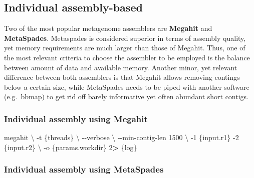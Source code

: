 \documentclass[
]{book}
\newenvironment{Shaded}{\begin{snugshade}}{\end{snugshade}}
\newcommand{\AttributeTok}[1]{\textcolor[rgb]{0.77,0.63,0.00}{#1}}
\newcommand{\DataTypeTok}[1]{\textcolor[rgb]{0.13,0.29,0.53}{#1}}
\newcommand{\DecValTok}[1]{\textcolor[rgb]{0.00,0.00,0.81}{#1}}
\newcommand{\ExtensionTok}[1]{#1}
\newcommand{\NormalTok}[1]{#1}
\newcommand{\OperatorTok}[1]{\textcolor[rgb]{0.81,0.36,0.00}{\textbf{#1}}}
\begin{document}
\hypertarget{individual-assembly-based}{%
\subsection{Individual assembly-based}\label{individual-assembly-based}}

Two of the most popular metagenome assemblers are \textbf{Megahit} and \textbf{MetaSpades}. Metaspades is considered superior in terms of assembly quality, yet memory requirements are much larger than those of Megahit. Thus, one of the most relevant criteria to choose the assembler to be employed is the balance between amount of data and available memory. Another minor, yet relevant difference between both assemblers is that Megahit allows removing contings below a certain size, while MetaSpades needs to be piped with another software (e.g.~bbmap) to get rid off barely informative yet often abundant short contigs.

\hypertarget{individual-assembly-using-megahit}{%
\subsubsection{Individual assembly using Megahit}\label{individual-assembly-using-megahit}}

\begin{Shaded}
\begin{Highlighting}[]
\ExtensionTok{megahit} \DataTypeTok{\textbackslash{}}
    \AttributeTok{{-}t}\NormalTok{ \{threads\} }\DataTypeTok{\textbackslash{}}
    \AttributeTok{{-}{-}verbose} \DataTypeTok{\textbackslash{}}
    \AttributeTok{{-}{-}min{-}contig{-}len}\NormalTok{ 1500 }\DataTypeTok{\textbackslash{}}
    \AttributeTok{{-}1}\NormalTok{ \{input.r1\} }\AttributeTok{{-}2}\NormalTok{ \{input.r2\} }\DataTypeTok{\textbackslash{}}
    \AttributeTok{{-}o}\NormalTok{ \{params.workdir\}}
    \DecValTok{2}\OperatorTok{\textgreater{}}\NormalTok{ \{log\}}
\end{Highlighting}
\end{Shaded}

\hypertarget{individual-assembly-using-metaspades}{%
\subsubsection{Individual assembly using MetaSpades}\label{individual-assembly-using-metaspades}}
\end{document}
